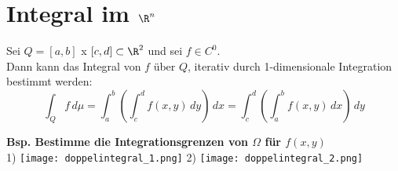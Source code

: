 \vspace{-0.7cm}\section{Integral im $\R^n$}
\begin{satz}[Fubini] Sei $Q = [a, b]$ x $[c, d] \subset \R^2$ und sei $f \in C^0$.\\
Dann kann das Integral von $f$ über $Q$, iterativ durch 1-dimensionale  Integration bestimmt werden:
\[
	\int_Q f \, d\mu = 
	\int_a^b \left( \int_c^d f(x, y) \, dy \right) \, dx = 
	\int_c^d \left( \int_a^b f(x, y) \, dx \right) \, dy
\]
\end{satz}

\textbf{Bsp. Bestimme die Integrationsgrenzen von $\Omega$ für $f(x, y)$}\\
1) \texttt{[image: doppelintegral\_1.png]} \hspace{1cm} 2) \texttt{[image: doppelintegral\_2.png]}
